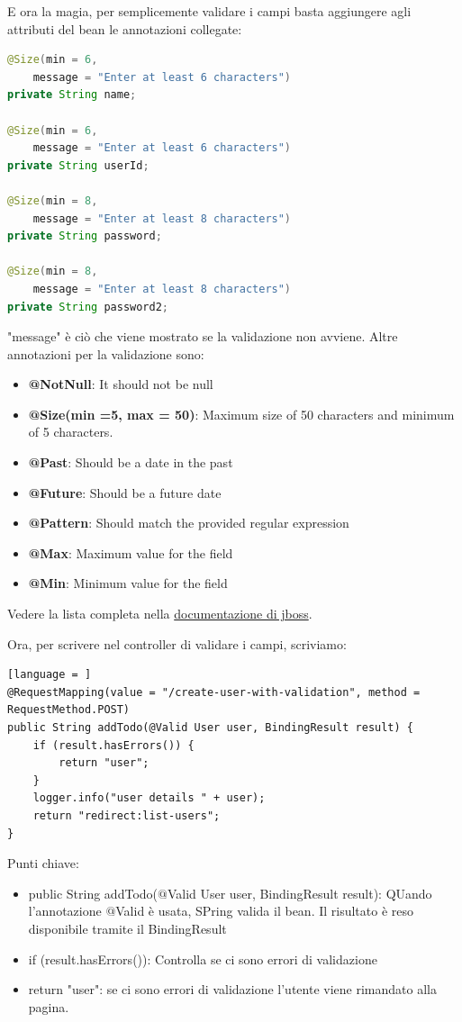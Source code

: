 \documentclass[11pt,a4paper]{book}
\begin{document}
E ora la magia, per semplicemente validare i campi basta aggiungere agli attributi del bean le annotazioni collegate:
\begin{lstlisting}[language = Java]
@Size(min = 6, 
	message = "Enter at least 6 characters")
private String name;

@Size(min = 6, 
	message = "Enter at least 6 characters")
private String userId;

@Size(min = 8, 
	message = "Enter at least 8 characters")
private String password;

@Size(min = 8, 
	message = "Enter at least 8 characters")
private String password2;
\end{lstlisting}
"message" è ciò che viene mostrato se la validazione non avviene.
Altre annotazioni per la validazione sono:
\begin{itemize}
	\item \textbf{@NotNull}: It should not be null
	\item \textbf{@Size(min =5, max = 50)}: Maximum size of 50 characters and minimum of 5 characters.
	\item \textbf{@Past}: Should be a date in the past
	\item \textbf{@Future}: Should be a future date
	\item \textbf{@Pattern}: Should match the provided regular expression
	\item \textbf{@Max}: Maximum value for the field
	\item \textbf{@Min}: Minimum value for the field
\end{itemize}
Vedere la lista completa nella \href{https://docs.jboss.org/hibernate/stable/validator/reference/en-US/html_single/#section-builtin-constraints}{documentazione di jboss}.

Ora, per scrivere nel controller di validare i campi, scriviamo:
\begin{lstlisting}[language = ]
@RequestMapping(value = "/create-user-with-validation",	method = RequestMethod.POST)
public String addTodo(@Valid User user, BindingResult result) {
	if (result.hasErrors()) {
		return "user";
	}
	logger.info("user details " + user);
	return "redirect:list-users";
}
\end{lstlisting}
Punti chiave:
\begin{itemize}
	\item public String addTodo($@$Valid User user, BindingResult result): QUando l'annotazione $@$Valid è usata, SPring valida il bean. Il risultato è reso disponibile tramite il BindingResult
	\item if (result.hasErrors()): Controlla se ci sono errori di validazione
	\item return "user": se ci sono errori di validazione l'utente viene rimandato alla pagina.
\end{itemize}
\end{document}
